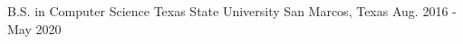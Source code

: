 \begin{cventries}

  \cventry
    {B.S. in Computer Science} %
    {Texas State University} %
    {San Marcos, Texas} %
    {Aug. 2016 - May 2020} %
  {
     \begin{cvitems} %
     \end{cvitems}
  }
\end{cventries}
